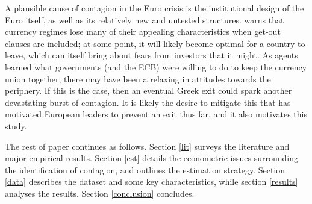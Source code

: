 \documentclass[/../base.tex]{subfiles}
\begin{document}
A plausible cause of contagion in the Euro crisis is the institutional design of the Euro itself, as well as its relatively new and untested structures.  \cite{obstfeld1997destabilizing} warns that currency regimes lose many of their appealing characteristics when get-out clauses are included; at some point, it will likely become optimal for a country to leave, which can itself bring about fears from investors that it might. As agents learned what governments (and the ECB) were willing to do to keep the currency union together, there may have been a relaxing in attitudes towards the periphery. If this is the case, then an eventual Greek exit could spark another devastating burst of contagion. It is likely the desire to mitigate this that has motivated European leaders to prevent an exit thus far, and it also motivates this study.

The rest of paper continues as follows. Section \ref{lit} surveys the literature and major empirical results. Section \ref{est} details the econometric issues surrounding the identification of contagion, and outlines the estimation strategy. Section \ref{data} describes the dataset and some key characteristics, while section \ref{results} analyses the results. Section \ref{conclusion} concludes.
\end{document}
